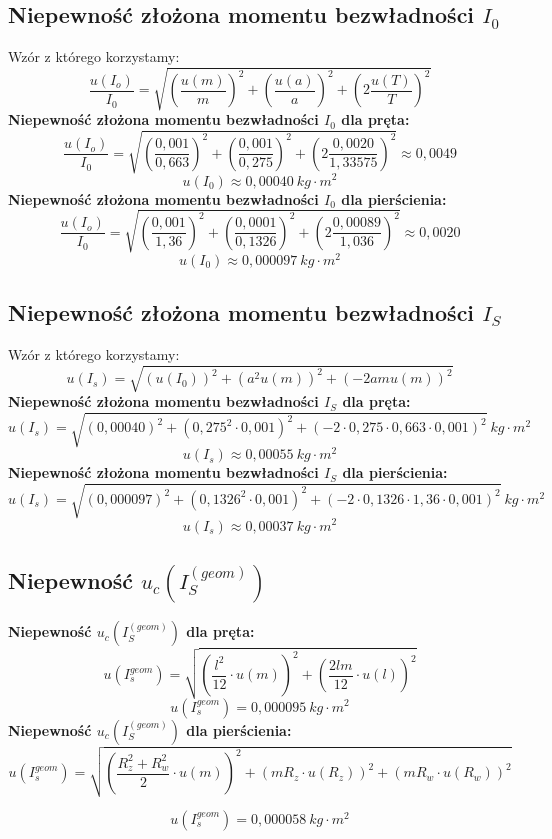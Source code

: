 \documentclass[a4paper,11pt]{article}
\begin{document}
\subsection{Niepewność złożona momentu bezwładności $I_{0}$}
Wzór z którego korzystamy:
$$\frac{u(I_o)}{I_0}=\sqrt{\left (\frac{u(m)}{m}\right ) ^2+\left ( \frac{u(a)}{a}\right )^2+\left (2 \frac{u(T)}{T}\right )^2}$$
\textbf{Niepewność złożona momentu bezwładności $I_{0}$ dla pręta:}
$$
\frac{u(I_o)}{I_0}=\sqrt{\left(\frac{0,001}{0,663}\right) ^2+\left( \frac{0,001}{0,275}\right)^2+\left(2 \frac{0,0020}{1,33575}\right)^2} \approx 0,0049
$$
$$u(I_0)\approx 0,00040~kg\cdot m^2$$
\textbf{Niepewność złożona momentu bezwładności $I_{0}$ dla pierścienia:}
$$
\frac{u(I_o)}{I_0}=\sqrt{\left(\frac{0,001}{1,36}\right) ^2+\left( \frac{0,0001}{0,1326}\right)^2+\left(2 \frac{0,00089}{1,036}\right)^2} \approx 0,0020
$$
$$u(I_0)\approx 0,000097~kg\cdot m^2$$
\subsection{Niepewność złożona momentu bezwładności $I_{S}$}
Wzór z którego korzystamy:
$$u(I_s)=\sqrt{\left( u(I_0)\right)^2+\left(a^2u(m) \right)^2+\left( -2amu(m)\right)^2}$$
\textbf{Niepewność złożona momentu bezwładności $I_{S}$ dla pręta:}
$$u(I_s)=\sqrt{\left( 0,00040\right)^2+\left(0,275^2\cdot 0,001 \right)^2+\left( -2\cdot 0,275\cdot 0,663\cdot 0,001\right)^2}~kg\cdot m^2$$
$$u(I_s)\approx 0,00055~kg\cdot m^2$$
\textbf{Niepewność złożona momentu bezwładności $I_{S}$ dla pierścienia:}
$$u(I_s)=\sqrt{\left( 0,000097\right)^2+\left(0,1326^2\cdot 0,001 \right)^2+\left( -2\cdot 0,1326\cdot 1,36\cdot 0,001\right)^2}~kg\cdot m^2$$
$$u(I_s)\approx 0,00037~kg\cdot m^2$$

\subsection{Niepewność $u_{c}(I_{S}^{(geom)})$}
\textbf{Niepewność $u_{c}(I_{S}^{(geom)})$ dla pręta:}
$$
u(I_{s}^{geom})=\sqrt{\left(\frac{l^2}{12}\cdot u(m) \right)^2+\left(\frac{2lm}{12}\cdot u(l) \right)^2}$$
$$u(I_{s}^{geom})=0,000095~kg\cdot m^2$$
\textbf{Niepewność $u_{c}(I_{S}^{(geom)})$ dla pierścienia:}
$$u(I_{s}^{geom})=\sqrt{\left (\frac{R_z^2+R_w^2}{2}\cdot u(m) \right )^2+\left (mR_z\cdot u(R_z) \right )^2+\left (mR_w\cdot u(R_w) \right )^2}$$

$$u(I_{s}^{geom})=0,000058~kg\cdot m^2$$
\end{document}
